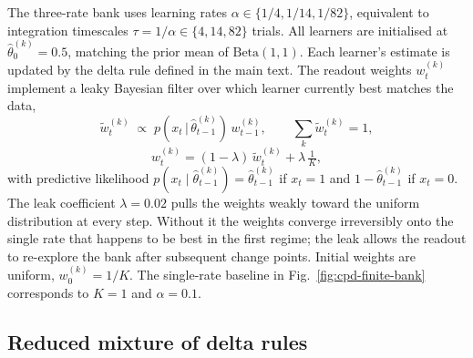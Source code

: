 The three-rate bank uses learning rates $\alpha \in \{1/4, 1/14, 1/82\}$, equivalent to integration timescales $\tau = 1/\alpha \in \{4, 14, 82\}$ trials. All learners are initialised at $\hat\theta_0^{(k)} = 0.5$, matching the prior mean of $\mathrm{Beta}(1,1)$. Each learner's estimate is updated by the delta rule defined in the main text. The readout weights $w_t^{(k)}$ implement a leaky Bayesian filter over which learner currently best matches the data,
\begin{equation}
    \tilde w_t^{(k)} \;\propto\; p\!\left(x_t \,\big|\, \hat\theta_{t-1}^{(k)}\right) \, w_{t-1}^{(k)},
    \qquad
    \sum_k \tilde w_t^{(k)} = 1,
    \label{eq:cpd-bayes-filter}
\end{equation}
\begin{equation}
    w_t^{(k)} = (1-\lambda)\,\tilde w_t^{(k)} + \lambda\, \tfrac{1}{K},
    \label{eq:cpd-leak}
\end{equation}
with predictive likelihood $p(x_t \mid \hat\theta_{t-1}^{(k)}) = \hat\theta_{t-1}^{(k)}$ if $x_t=1$ and $1-\hat\theta_{t-1}^{(k)}$ if $x_t=0$. The leak coefficient $\lambda = 0.02$ pulls the weights weakly toward the uniform distribution at every step. Without it the weights converge irreversibly onto the single rate that happens to be best in the first regime; the leak allows the readout to re-explore the bank after subsequent change points. Initial weights are uniform, $w_0^{(k)} = 1/K$. The single-rate baseline in Fig.~\ref{fig:cpd-finite-bank} corresponds to $K=1$ and $\alpha = 0.1$.

\subsection{Reduced mixture of delta rules}

